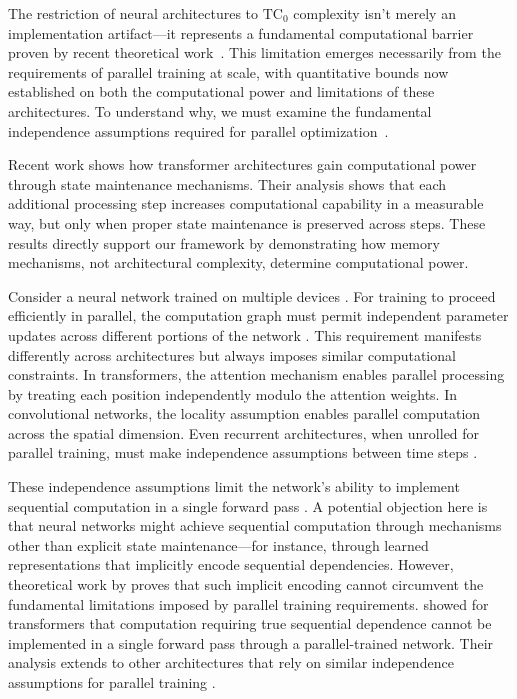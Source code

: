 \documentclass[12pt]{article}
\begin{document}
The restriction of neural architectures to $\text{TC}_0$ complexity isn't merely an implementation artifact---it represents a fundamental computational barrier proven by recent theoretical work~\cite{merrill2023parallelism,peng2024limitations}.
This limitation emerges necessarily from the requirements of parallel training at scale, with quantitative bounds now established on both the computational power and limitations of these architectures.
To understand why, we must examine the fundamental independence assumptions required for parallel optimization~\cite{shallue2019measuring}.

Recent work \cite{merrill2024} shows how transformer architectures gain computational power through state maintenance mechanisms.
Their analysis shows that each additional processing step increases computational capability in a measurable way, but only when proper state maintenance is preserved across steps.
These results directly support our framework by demonstrating how memory mechanisms, not architectural complexity, determine computational power.

Consider a neural network trained on multiple devices \cite{zhao2024epha}.
For training to proceed efficiently in parallel, the computation graph must permit independent parameter updates across different portions of the network \cite{barrett2019analyzing}.
This requirement manifests differently across architectures but always imposes similar computational constraints.
In transformers, the attention mechanism enables parallel processing by treating each position independently modulo the attention weights.
In convolutional networks, the locality assumption enables parallel computation across the spatial dimension.
Even recurrent architectures, when unrolled for parallel training, must make independence assumptions between time steps \cite{dickson2023rnns}.

These independence assumptions limit the network's ability to implement sequential computation in a single forward pass \cite{wei2022chain}. A potential objection here is that neural networks might achieve sequential computation through mechanisms other than explicit state maintenance---for instance, through learned representations that implicitly encode sequential dependencies. However, theoretical work by \cite{merrill2023parallelism} proves that such implicit encoding cannot circumvent the fundamental limitations imposed by parallel training requirements.
\cite{merrill2023parallelism} showed for transformers that computation requiring true sequential dependence cannot be implemented in a single forward pass through a parallel-trained network.
Their analysis extends to other architectures that rely on similar independence assumptions for parallel training \cite{stillman2023generative}.
\end{document}
